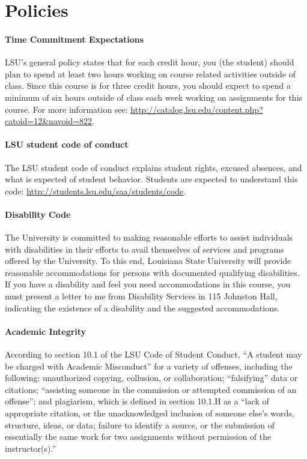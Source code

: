 \documentclass[11pt,article,oneside]{memoir}
\begin{document}

\section{Policies}

\paragraph{Time Commitment Expectations}
LSU's general policy states that for each credit hour, you (the student) should plan to
spend at least two hours working on course related activities outside of class. Since this course is for three credit hours, you should expect to spend a minimum of six hours outside of class each week working on assignments for this course. For more information see: 
\url{http://catalog.lsu.edu/content.php?catoid=12&navoid=822}.

\paragraph{LSU student code of conduct}
The LSU student code of conduct explains student rights, excused absences, and what is expected of student behavior. Students are expected to understand this code:  \url{http://students.lsu.edu/saa/students/code}.

\paragraph{Disability Code}
The University is committed to making reasonable efforts to assist individuals with disabilities in
their efforts to avail themselves of services and programs offered by the University. To this end,
Louisiana State University will provide reasonable accommodations for persons with
documented qualifying disabilities. If you have a disability and feel you need accommodations in
this course, you must present a letter to me from Disability Services in 115 Johnston Hall,
indicating the existence of a disability and the suggested accommodations.

\paragraph{Academic Integrity}
According to section 10.1 of the LSU Code of Student Conduct, ``A student may be charged with Academic Misconduct'' for a variety of offenses, including the following: unauthorized copying, collusion, or collaboration; ``falsifying'' data or citations; ``assisting someone in the commission or attempted commission of an offense''; and plagiarism, which is defined in section 10.1.H as a ``lack of appropriate citation, or the unacknowledged inclusion of someone else's words, structure, ideas, or data; failure to identify a source, or the submission of essentially the same work for two assignments without permission of the instructor(s).''
\end{document}
